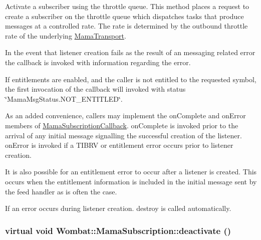 Activate a subscriber using the throttle queue. This method places a request to create a subscriber on the throttle queue which dispatches tasks that produce messages at a controlled rate. The rate is determined by the outbound throttle rate of the underlying {\ttfamily \hyperlink{classWombat_1_1MamaTransport}{MamaTransport}}.

In the event that listener creation fails as the result of an messaging related error the callback is invoked with information regarding the error.

If entitlements are enabled, and the caller is not entitled to the requested symbol, the first invocation of the callback will invoked with status \char`\"{}MamaMsgStatus.NOT\_\-ENTITLED\char`\"{}.

As an added convenience, callers may implement the {\ttfamily onComplete} and {\ttfamily onError} members of {\ttfamily \hyperlink{classWombat_1_1MamaSubscriptionCallback}{MamaSubscriptionCallback}}. {\ttfamily onComplete} is invoked prior to the arrival of any initial message signalling the successful creation of the listener. {\ttfamily onError} is invoked if a TIBRV or entitlement error occurs prior to listener creation.

It is also possible for an entitlement error to occur after a listener is created. This occurs when the entitlement information is included in the initial message sent by the feed handler as is often the case.

If an error occurs during listener creation. {\ttfamily destroy} is called automatically. \hypertarget{classWombat_1_1MamaSubscription_aa551169dd15b61496f6e6ef6974996e3}{
\subsubsection[{deactivate}]{\setlength{\rightskip}{0pt plus 5cm}virtual void Wombat::MamaSubscription::deactivate ()}}
\label{classWombat_1_1MamaSubscription_aa551169dd15b61496f6e6ef6974996e3}


